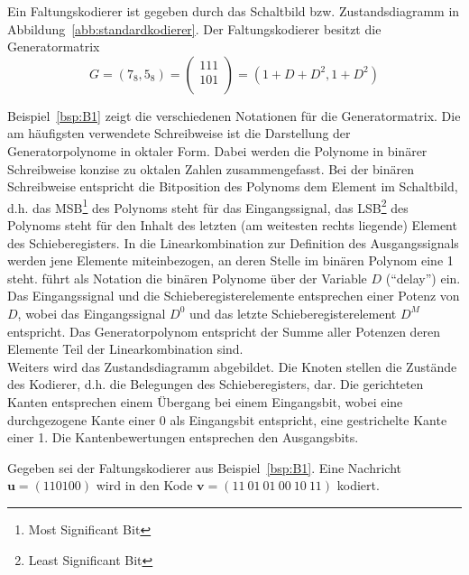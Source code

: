 \begin{beispiel} Ein Faltungskodierer ist gegeben durch das Schaltbild bzw. Zustandsdiagramm in Abbildung~\ref{abb:standardkodierer}. Der Faltungskodierer besitzt die Generatormatrix 
\begin{equation*}
G=\left(7_{8},5_{8}\right) = \begin{pmatrix}
111 \\
101 \\
\end{pmatrix} = \left(1+D+D^{2}, 1+D^{2} \right)
\end{equation*}
\label{bsp:B1}
\end{beispiel}
Beispiel~\ref{bsp:B1} zeigt die verschiedenen Notationen für die Generatormatrix. Die am häufigsten verwendete Schreibweise ist die Darstellung der Generatorpolynome in oktaler Form. Dabei werden die Polynome in binärer Schreibweise konzise zu oktalen Zahlen zusammengefasst. Bei der binären Schreibweise entspricht die Bitposition des Polynoms dem Element im Schaltbild, d.h. das MSB\footnote{Most Significant Bit} des Polynoms steht für das Eingangssignal, das LSB\footnote{Least Significant Bit} des Polynoms steht für den Inhalt des letzten (am weitesten rechts liegende) Element des Schieberegisters. In die Linearkombination zur Definition des Ausgangssignals werden jene Elemente miteinbezogen, an deren Stelle im binären Polynom eine 1 steht. \cite{huffman2010fundamentals} führt als Notation die binären Polynome über der Variable $D$ (\enquote{delay}) ein. Das Eingangssignal und die Schieberegisterelemente entsprechen einer Potenz von $D$, wobei das Eingangssignal $D^{0}$ und das letzte Schieberegisterelement $D^{M}$ entspricht. Das Generatorpolynom entspricht der Summe aller Potenzen deren Elemente Teil der Linearkombination sind.
\\
Weiters wird das Zustandsdiagramm abgebildet. Die Knoten stellen die Zustände des Kodierer, d.h. die Belegungen des Schieberegisters, dar. Die gerichteten Kanten entsprechen einem Übergang bei einem Eingangsbit, wobei eine durchgezogene Kante einer 0 als Eingangsbit entspricht, eine gestrichelte Kante einer 1. Die Kantenbewertungen entsprechen den Ausgangsbits.

\begin{beispiel} Gegeben sei der Faltungskodierer aus Beispiel~\ref{bsp:B1}. Eine Nachricht $\mathbf{u}=\left( 110100\right)$ wird in den Kode $\mathbf{v}=\left( 11~01~01~00~10~11\right)$ kodiert.
\label{bsp:B2}
\end{beispiel}

